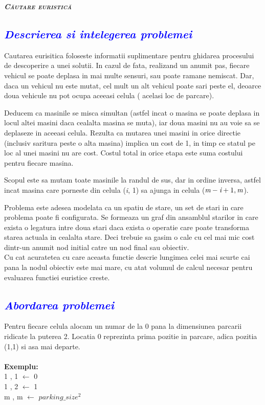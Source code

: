 \documentclass{article}
\begin{document}
    \begin{center}
        \textsc{\Huge \textbf{\itshape Căutare euristică}}\\[0.5cm]
         \vspace{10mm}
    \end{center}
 \textcolor{blue}{\subsection{\itshape \textcolor{blue}{Descrierea si intelegerea problemei }}}
\vspace{10mm}
\quad Cautarea eurisitica foloseste informatii suplimentare pentru
ghidarea procesului de descoperire a unei solutii. In cazul de fata, realizand un anumit pas, fiecare vehicul se poate deplasa in mai multe sensuri, sau poate ramane nemiscat. Dar, daca un vehicul nu este mutat, cel mult un alt vehicul poate sari peste el, deoarce doua vehicule nu pot ocupa aceeasi celula ( acelasi loc de parcare).\par 
\quad Deducem ca masinile se misca simultan (astfel incat o masina se poate deplasa in locul altei masini daca cealalta masina se muta), iar doua masini nu au voie sa se deplaseze in aceeasi celula. Rezulta ca mutarea unei masini in orice directie (inclusiv saritura peste o alta masina) implica un cost de 1, in timp ce statul pe loc al unei masini nu are cost. Costul total in orice etapa este suma costului pentru fiecare masina.\par 
\quad Scopul este sa mutam toate masinile la randul de sus, dar in ordine inversa, astfel incat masina care porneste din celula (\emph i, 1) sa ajunga in celula (\(\emph m - \emph i + 1, \emph m \)).\par
\quad Problema este adesea modelata ca un spatiu de stare, un set de stari in care problema poate fi configurata. Se formeaza un graf din ansamblul starilor in care exista o legatura intre doua stari daca exista o operatie care poate transforma starea actuala in cealalta stare. Deci trebuie sa gasim o cale cu cel mai mic cost dintr-un anumit nod initial catre un nod final sau obiectiv.\\ Cu cat acuratetea cu care aceasta functie descrie lungimea celei mai scurte cai pana la nodul obiectiv este mai mare, cu atat volumul de calcul necesar pentru evaluarea functiei euristice creste. \par
\vspace{5mm}
\textcolor{blue}{\subsection{\itshape \textcolor{blue}{ Abordarea  problemei }}}
\vspace{10mm}
\quad  Pentru fiecare celula alocam un numar de la 0 pana la dimensiunea parcarii ridicate la puterea 2. Locatia 0 reprezinta prima pozitie in parcare, adica pozitia (1,1) si asa mai departe. \\\\
\textbf{Exemplu: \\} 
1 , 1 $\leftarrow$ 0 \\ 
1 , 2 $\leftarrow$ 1 \\
m , m $\leftarrow$ \(parking\_size^2\)\\\
\end{document}
